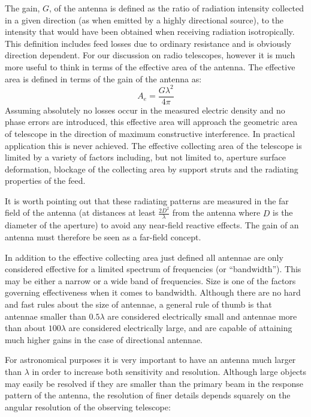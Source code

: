The gain, $G$, of the antenna is defined as the ratio of radiation intensity collected in a given direction (as when emitted by a highly 
directional source), to the intensity that would have been obtained when receiving radiation isotropically. This definition includes feed losses
due to ordinary resistance and is obviously direction dependent. For our discussion on radio telescopes, however it is much more useful to think in terms of 
the effective area of the antenna. The effective area is defined in terms of the gain of the antenna as:
\begin{equation*}
 A_e = \frac{G\lambda^2}{4\pi}
\end{equation*}
Assuming absolutely no losses occur in the measured electric density and no phase errors are introduced, this effective area will approach the geometric area of telescope in the direction
of maximum constructive interference. In practical application this is never achieved. The effective collecting area of the telescope is limited by a variety of
factors including, but not limited to, aperture surface deformation, blockage of the collecting area by support struts and the radiating properties of the feed.

It is worth pointing out that these radiating patterns are measured in the far field of the antenna (at distances at least $\frac{2D^2}{\lambda}$ from
the antenna where $D$ is the diameter of the aperture) to avoid any near-field reactive effects. The gain of an antenna must therefore be seen as a 
far-field concept.

In addition to the effective collecting area just defined all antennae are only considered effective for a limited spectrum of frequencies (or ``bandwidth''). 
This may be either a narrow or a wide band of frequencies. Size is one of the factors governing effectiveness when it comes to bandwidth. 
Although there are no hard and fast rules about the size of antennae, a general rule of thumb is that antennae smaller than $0.5\lambda$ are considered electrically small and antennae more than 
about $100\lambda$ are considered electrically large, and are capable of attaining much higher gains in the case of directional antennae.

For astronomical purposes it is very important to have an antenna much larger than $\lambda$ in order to increase both sensitivity 
and resolution. Although large objects may easily be resolved if they are smaller than the primary beam in the response pattern of the antenna, 
the resolution of finer details depends squarely on the angular resolution of the observing telescope:

